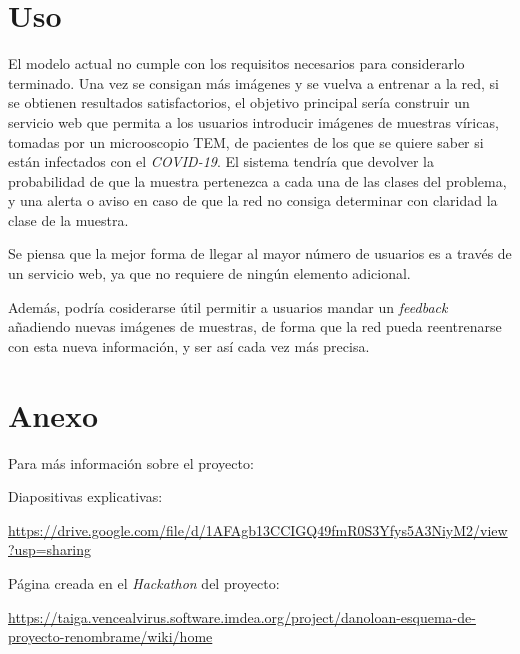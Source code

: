 \documentclass{uc3mpracticas}
\begin{document}
  \newpage

  \section{Uso}

  El modelo actual no cumple con los requisitos necesarios para considerarlo terminado. Una vez se consigan más imágenes y se vuelva a entrenar a la red, si se obtienen resultados satisfactorios, el objetivo principal sería construir un servicio web que permita a los usuarios introducir imágenes de muestras víricas, tomadas por un microoscopio TEM, de pacientes de los que se quiere saber si están infectados con el \textit{COVID-19}. El sistema tendría que devolver la probabilidad de que la muestra pertenezca a cada una de las clases del problema, y una alerta o aviso en caso de que la red no consiga determinar con claridad la clase de la muestra.

  \vspace{2mm}

  Se piensa que la mejor forma de llegar al mayor número de usuarios es a través de un servicio web, ya que no requiere de ningún elemento adicional.

  \vspace{2mm}

  Además, podría cosiderarse útil permitir a usuarios mandar un \textit{feedback} añadiendo nuevas imágenes de muestras, de forma que la red pueda reentrenarse con esta nueva información, y ser así cada vez más precisa.

  \section{Anexo}

  Para más información sobre el proyecto:

  \vspace{5mm}

  Diapositivas explicativas:

  \url{https://drive.google.com/file/d/1AFAgb13CCIGQ49fmR0S3Yfys5A3NiyM2/view?usp=sharing}

  \vspace{1mm}

  Página creada en el \textit{Hackathon} del proyecto:

   \url{https://taiga.vencealvirus.software.imdea.org/project/danoloan-esquema-de-proyecto-renombrame/wiki/home}

  \vspace{15mm}
\end{document}
